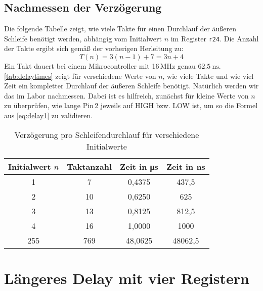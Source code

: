 \documentclass[a4paper,12pt]{article}
\begin{document}
\subsection{Nachmessen der Verzögerung}

Die folgende Tabelle zeigt, wie viele Takte für einen Durchlauf der äußeren
Schleife benötigt werden, abhängig vom Initialwert \( n \) im Register
\texttt{r24}. Die Anzahl der Takte ergibt sich gemäß der vorherigen Herleitung
zu:
\begin{equation}
    \label{eq:delay1}
    T(n) = 3(n - 1) + 7 = 3n + 4
\end{equation}
Ein Takt dauert bei einem Mikrocontroller mit 16\,MHz genau
\( \SI{62.5}{\nano\second} \). 
\autoref{tab:delaytimes} zeigt für verschiedene Werte von \( n \), wie viele
Takte und wie viel Zeit ein kompletter Durchlauf der äußeren Schleife benötigt.
Natürlich werden wir das im Labor nachmessen. Dabei ist es hilfreich, zunächst
für kleine Werte von \( n \) zu überprüfen, wie lange Pin 2 jeweils auf HIGH
bzw. LOW ist, um so die Formel aus \eqref{eq:delay1} zu validieren.

\begin{table}[H]
\centering
\begin{tabular}{c c c c}
\toprule
Initialwert \( n \) & Taktanzahl & Zeit in \si{\micro\second} & Zeit in \si{\nano\second} \\
\midrule
1   & 7   & 0{,}4375  & 437{,}5 \\
2   & 10  & 0{,}6250  & 625 \\
3   & 13  & 0{,}8125  & 812{,}5 \\
4   & 16  & 1{,}0000  & 1000 \\
255 & 769 & 48{,}0625 & 48062{,}5 \\
\bottomrule
\end{tabular}
\caption{Verzögerung pro Schleifendurchlauf für verschiedene Initialwerte}
\label{tab:delaytimes}
\end{table}


\newpage
\section{Längeres Delay mit vier Registern}
\end{document}
